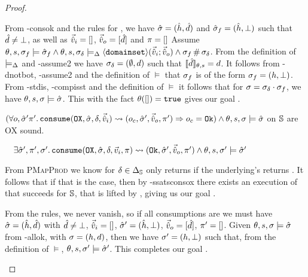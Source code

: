 \begin{proof}
\begin{hypvlist}
 From \hyp{consok} and the rules for \consume{}, we have $\hat{\sigma}=(\hat{h},\hat{d})$ and $\hat{\sigma}_f=(\hat{h},\bot)$ such that $\hat{d}\neq\bot$, as well as $\vec{\hat{v}}_i=[]$, $\vec{\hat{v}}_o=[\hat{d}]$ and $\pi=[]$
 Assume $\theta,s,\sigma_f\models \hat{\sigma}_f \land \theta, s, \sigma_\delta \models_{\Delta} \left<\texttt{domainset}\right>\!(\vec{\hat{v}}_i;\vec{\hat{v}}_o) \land \sigma_f\operatorname{\#}\sigma_\delta$.
 From the definition of $\models_{\Delta}$ and \hyp{assume2} we have $\sigma_\delta=(\emptyset, d)$ such that $\llbracket\hat{d}\rrbracket_{\theta,s}=d$.
 It follows from \hyp{dnotbot}, \hyp{assume2} and the definition of $\models$ that $\sigma_f$ is of the form $\sigma_f=(h, \bot)$.
 From \hyp{stdis}, \hyp{compisst} and the definition of $\models$ it follows that for $\sigma=\sigma_\delta\cdot\sigma_f$, we have $\theta,s,\sigma\models\hat{\sigma}$. This with the fact $\theta([])=\texttt{true}$ gives our goal .
\end{hypvlist}


\pfassume \begin{hypvlist}
 $(\forall o, \hat{\sigma}'\pi'\ldotp \texttt{consume}(\texttt{OX},\hat{\sigma},\delta,\vec{\hat{v}}_i)\rightsquigarrow (o_c, \hat{\sigma}', \vec{\hat{v}}_o, \pi')\Rightarrow o_c = \texttt{Ok})\land \theta, s, \sigma \models \hat{\sigma}$
 \consume{} on $\mathbb S$ are OX sound.
\end{hypvlist}
\pfprove \begin{goalvlist}
 $\quad \exists  \hat{\sigma}', \pi', \sigma'\ldotp \texttt{consume}(\texttt{OX}, \hat{\sigma}, \delta,\vec{v}_i,\pi)\rightsquigarrow (\texttt{Ok}, \hat{\sigma}', \vec{\hat{v}}_o, \pi') \land \theta,s,\sigma' \models \hat{\sigma}'$
\end{goalvlist}

\pfcase{$\delta \in \preds_\mmdl$}

From \textsc{PMapProd} we know \consume{} for $\delta\in\preds_\mmdl$ only returns \Ok{} if the underlying's \consume{} returns \Ok. It follows that if that is the case, then by \hyp{ssatsconsox} there exists an execution of \consume{} that succeeds for $\mathbb S$, that is lifted by \PMap, giving us our goal .

\pfcase{$\delta = \domainset$}

\begin{hypvlist}
 From the \consume{} rules, we never vanish, so if all consumptions are \Ok{} we must have $\hat{\sigma}=(\hat{h},\hat{d})$ with $\hat{d}\neq\bot$, $\vec{\hat{v}}_i=[]$, $\hat{\sigma}'=(\hat{h},\bot)$, $\vec{\hat{v}}_o=[\hat{d}]$, $\pi'=[]$.
 Given $\theta,s,\sigma\models\hat{\sigma}$ from \hyp{allok}, with $\sigma=(h,d)$, then we have $\sigma'=(h,\bot)$ such that, from the definition of $\models$, $\theta,s,\sigma'\models\hat{\sigma}'$. This completes our goal .
\end{hypvlist}


\end{proof}
